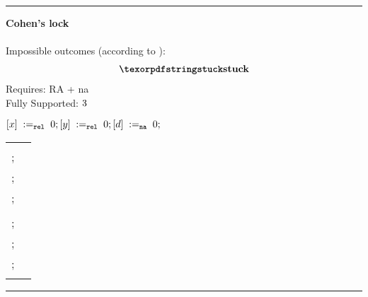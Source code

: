 \vspace{.2cm}
\hrule
\vspace{.2cm}

\begin{minipage}[t]{0.4\linewidth}
\textbf{Cohen's lock}\\\\
Impossible outcomes (according to \cite{Turon-al:OOPSLA14}):\\
\[\begin{array}{l}
  \Stuck
\end{array}\]
Requires: RA + na\\
Fully Supported: $\tick$\\
\end{minipage}
%
\codePrefix
  $[x] \;:=_{{\mathtt{rel}}}\;0;[y] \;:=_{{\mathtt{rel}}}\;0;[d] \;:=_{\mathtt{na}}\;0;$ \\
  \begin{tabular}{L || L}
    \begin{array}{@{}l@{}}
      ; \\
      ; \\
      ; \\
      ; \\
    \end{array} &

    \begin{array}{@{}l@{}}
      ; \\
      ; \\
      ; \\
      ; \\
    \end{array}
  \end{tabular}
\codePostfix

\vspace{.2cm}
\hrule
